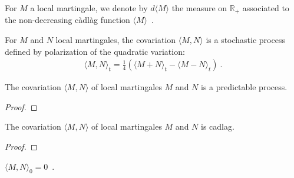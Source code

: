 \begin{definition}\label{def:quadraticVariationMeasure}
For $M$ a local martingale, we denote by $d\langle M \rangle$ the measure on $\mathbb{R}_+$ associated to the non-decreasing càdlàg function $\langle M \rangle$~.
\end{definition}


\begin{definition}[Covariation]\label{def:covariation}
For $M$ and $N$ local martingales, the covariation $\langle M, N \rangle$ is a stochastic process defined by polarization of the quadratic variation:
\begin{align*}
  \langle M, N \rangle_t = \frac{1}{4}\left(\langle M+N \rangle_t - \langle M-N \rangle_t \right)
  \: .
\end{align*}

\end{definition}


\begin{lemma}\label{lem:predictable_covariation}
The covariation $\langle M, N \rangle$ of local martingales $M$ and $N$ is a predictable process.
\end{lemma}

\begin{proof}

\end{proof}


\begin{lemma}\label{lem:cadlag_covariation}
The covariation $\langle M, N \rangle$ of local martingales $M$ and $N$ is cadlag.
\end{lemma}

\begin{proof}

\end{proof}


\begin{lemma}\label{lem:covariation_zero}
$\langle M, N \rangle_0 = 0$~.
\end{lemma}

